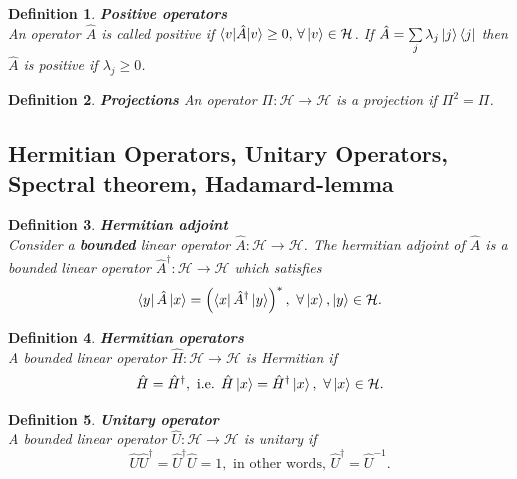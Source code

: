 \documentclass[12pt, a4paper,  nobibnotes]{article}
\newtheorem{definition}{Definition}
\begin{document}
\begin{definition}
    \textbf{Positive operators}\\
    An operator $\hat A$ is called positive if $\braket{v|\hat A|v} \geq 0,\,\forall \ket v \in \mathcal{H}$.
    If $\hat A = \sum\limits_j \lambda_j \ket j \bra j$ then $\hat A$ is positive if $\lambda_j \geq 0$.
\end{definition}

\begin{definition}
    \textbf{Projections}
    An operator $\Pi:\mathcal H \rightarrow \mathcal H$ is a projection if $\Pi^2=\Pi$.
\end{definition}

\subsection{Hermitian Operators, Unitary Operators, Spectral theorem, Hadamard-lemma}
\begin{definition}
    \textbf{Hermitian adjoint}
    \\Consider a \textbf{bounded} linear operator $\hat A: \mathcal H \rightarrow \mathcal H$. The hermitian adjoint of 
    $\hat A$ is a bounded linear operator $\hat A^\dagger : \mathcal H \rightarrow \mathcal H$ which satisfies
    \begin{equation}
        \bra y \hat A \ket x = \left( \bra x \hat A^\dagger \ket y \right)^*, ~\forall \ket x, \ket y \in \mathcal H.
    \end{equation}
\end{definition}

\begin{definition}
    \textbf{Hermitian operators}
    \\ A bounded linear operator $\hat H : \mathcal H\rightarrow \mathcal H$ is Hermitian if 
    \begin{equation}
        \hat H = \hat H^\dagger, \textrm{ i.e. } \hat H\ket x = \hat H^\dagger \ket x, ~\forall \ket x \in \mathcal H.
    \end{equation}
\end{definition}

\begin{definition}
    \textbf{Unitary operator}
    \\A bounded linear operator $\hat U : \mathcal H\rightarrow \mathcal H$ is unitary if 
    \begin{equation}
        \hat U\hat U^\dagger = \hat U^\dagger \hat U = 1, \textrm{ in other words, } \hat U^{\dagger} = \hat U^{-1}. 
    \end{equation}
\end{definition}
\end{document}
